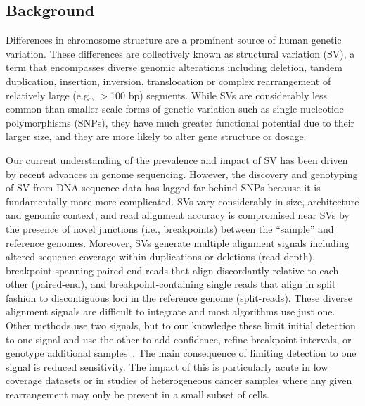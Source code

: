 \documentclass[10pt]{bmc_article}
\newenvironment{bmcformat}{\begin{raggedright}\baselineskip20pt\sloppy\setboolean{publ}{false}}{\end{raggedright}\baselineskip20pt\sloppy}
\begin{document}
\begin{bmcformat}
\section*{Background}
Differences in chromosome structure are a prominent source of human genetic
variation. These differences are collectively known as structural variation
(SV), a term that encompasses diverse genomic alterations including deletion,
tandem duplication, insertion, inversion, translocation or complex rearrangement
of relatively large (e.g., $>$100 bp) segments. While SVs are considerably less
common than smaller-scale forms of genetic variation such as single nucleotide
polymorphisms (SNPs), they have much greater functional potential due to their
larger size, and they are more likely to alter gene structure or dosage.

Our current understanding of the prevalence and impact of SV has
been driven by recent advances in genome sequencing. However, the discovery and
genotyping of SV from DNA sequence data has lagged far behind SNPs because it is
fundamentally more more complicated. SVs vary considerably in size, architecture
and genomic context, and read alignment accuracy is compromised near SVs by the
presence of novel junctions (i.e., breakpoints) between the ``sample'' and
reference genomes. Moreover, SVs generate multiple alignment signals including
altered sequence coverage within duplications or deletions (read-depth),
breakpoint-spanning paired-end reads that align discordantly relative to each
other (paired-end), and breakpoint-containing single reads that align in split
fashion to discontiguous loci in the reference genome (split-reads). These
diverse alignment signals are difficult to integrate and most algorithms use
just one. Other methods use two signals, but to our knowledge these limit
initial detection to one signal and use the other to add confidence, refine
breakpoint intervals, or genotype additional
samples~\cite{rausch2012b,sindi2012,handsaker2011}. The main consequence of
limiting detection to one signal is reduced sensitivity.  The impact of this is
particularly acute in low coverage datasets or in studies of heterogeneous
cancer samples where any given rearrangement may only be present in a small
subset of cells.





\end{bmcformat}
\end{document}
